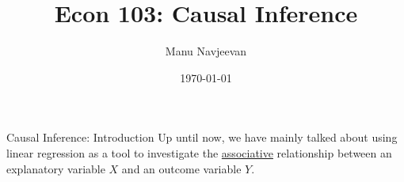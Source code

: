 \documentclass[notheorems, 9pt]{beamer}
\title{Econ 103: Causal Inference} %
\author{Manu Navjeevan}
\institute{UCLA}
\date{\today}
\begin{document}
\frame{\titlepage}

\begin{frame}{Causal Inference: Introduction} %
	\label{frame:intro1} %
	Up until now, we have mainly talked about using linear regression as a tool to investigate the \underline{associative} relationship between an explanatory variable \(X\) and an outcome variable  \(Y\).
\end{frame}
\end{document}
